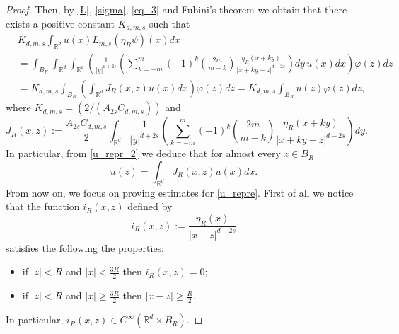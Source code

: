 \documentclass[letterpaper, 11pt,  reqno]{amsart}
\theoremstyle{definition}
\theoremstyle{remark}
\numberwithin{equation}{section}
\newcommand{\R}{{\mathbb R}}
\begin{document}
\begin{proof}
		Then, by \eqref{L}, \eqref{sigma}, \eqref{eq_3} and  Fubini's theorem we obtain that there exists a positive constant $K_{d,m,s}$ such that
		\begin{equation}\label{u_repr_2}
			\begin{split}
				&K_{d,m,s}\int_{\R^d}u(x)L_{m,s} (\eta_R \psi)(x)dx\\
				&\!=\! \int_{B_R}\int_{\R^d}\int_{\R^d} \left(\!\frac{1}{|y|^{d+2s}}\left(\sum_{k=-m}^{m}(-1)^{k}\binom{2m}{m-k}\frac{\eta_R(x+ky)}{|x+ky-z|^{d-2s}}\!\!\right)dy\, u(x)dx\! \!\right)\!\varphi(z)dz\\
				&\!=K_{d,m,s}\int_{B_R}\left(\int_{\R^d}J_{R}(x,z)u( x)dx \right)\varphi(z)dz=K_{d,m,s}\int_{B_{R}}u(z)\varphi(z)dz,
			\end{split}
		\end{equation}
		where $K_{d,m,s}=(2/(A_{2s} C_{d,m,s}))$ and
		\begin{equation}\label{J_1}
			J_{R}(x,z):=\frac{A_{2s} C_{d,m,s}}{2}\int_{\R^d}\frac{1}{|y|^{d+2s}}\left(\sum_{k=-m}^{m}(-1)^{k}\binom{2m}{m-k}\frac{\eta_R(x+ky)}{|x+ky-z|^{d-2s}}\right)dy.
		\end{equation}
		In particular, from \eqref{u_repr_2} we deduce that for almost every $z\in B_R$
		\begin{equation}\label{u_repre}
			u(z)=\int_{\R^d}J_R(x,z)u(x)dx.
		\end{equation}
		From now on, we focus on proving estimates for \eqref{u_repre}.
		First of all we notice that the function $i_R(x,z)$ defined by 
		\begin{equation*}
			i_R(x,z):=\frac{\eta_R(x)}{|x-z|^{d-2s}}
		\end{equation*} 
		satisfies the following the properties:
		\begin{itemize}
			\item if $|z|<R$ and $|x|<\frac{3R}{2}$ then $i_R(x,z)=0$;
			\item if $|z|< R$ and  $|x|\ge \frac{3R}{2}$ then $|x-z|\ge \frac{R}{2}.$
		\end{itemize}
		In particular, $i_R(x,z)\in C^{\infty}(\R^d\times {B_R})$. 

\end{proof}
\end{document}
